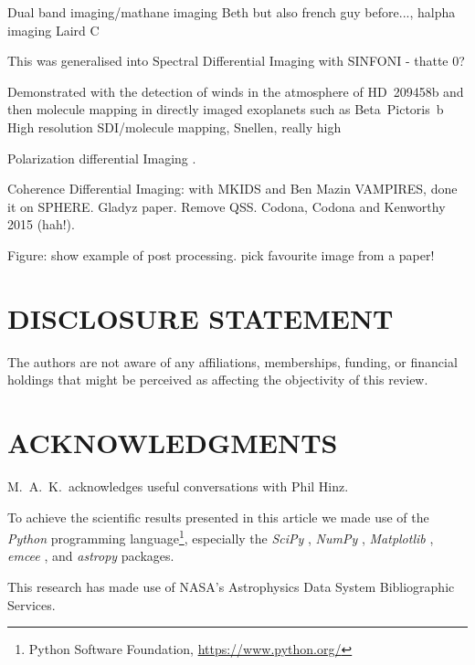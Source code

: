 \documentclass[letterpaper]{ar-1col}
\begin{document}
Dual band imaging/mathane imaging Beth but also french guy before..., halpha imaging Laird C

This was generalised into Spectral Differential Imaging with SINFONI - thatte 0?
\citet{Thatte07}

Demonstrated with the detection of winds in the atmosphere of HD~209458b \citep{Snellen10} and then molecule mapping in directly imaged exoplanets such as Beta~Pictoris~b \citep{Hoeijmakers18}
High resolution SDI/molecule mapping, Snellen, really high

Polarization differential Imaging \citep{Gledhill91}.

Coherence Differential Imaging: with MKIDS and Ben Mazin VAMPIRES, done it on SPHERE.
Gladyz paper. Remove QSS. Codona, Codona and Kenworthy 2015 (hah!).

Figure: show example of post processing. pick favourite image from a paper!

\lipsum[2-4]

\section*{DISCLOSURE STATEMENT}
The authors are not aware of any affiliations, memberships, funding, or financial holdings that
might be perceived as affecting the objectivity of this review.

\section*{ACKNOWLEDGMENTS}
M.\ A.\ K.\ acknowledges useful conversations with
Phil Hinz.


To achieve the scientific results presented in this article we made use of the \emph{Python} programming language\footnote{Python Software Foundation, \url{https://www.python.org/}}, especially the \emph{SciPy} \citep{virtanen2020}, \emph{NumPy} \citep{numpy}, \emph{Matplotlib} \citep{Matplotlib}, \emph{emcee} \citep{foreman-mackey2013}, and \emph{astropy} \citep{astropy_1,astropy_2} packages.
%

This research has made use of NASA's Astrophysics Data System Bibliographic Services.





\end{document}
